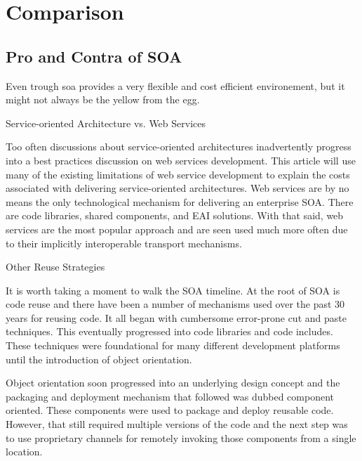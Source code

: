 \documentclass[12pt]{article}
\begin{document}
\section{Comparison}
\subsection{Pro and Contra of SOA}
Even trough \gls{soa} provides a very flexible and cost efficient environement, but it might not always be the yellow from the egg.



Service-oriented Architecture vs. Web Services

Too often discussions about service-oriented architectures inadvertently progress into a best practices discussion on web services development. This article will use many of the existing limitations of web service development to explain the costs associated with delivering service-oriented architectures. Web services are by no means the only technological mechanism for delivering an enterprise SOA. There are code libraries, shared components, and EAI solutions. With that said, web services are the most popular approach and are seen used much more often due to their implicitly interoperable transport mechanisms.

Other Reuse Strategies

It is worth taking a moment to walk the SOA timeline. At the root of SOA is code reuse and there have been a number of mechanisms used over the past 30 years for reusing code. It all began with cumbersome error-prone cut and paste techniques. This eventually progressed into code libraries and code includes. These techniques were foundational for many different development platforms until the introduction of object orientation.

Object orientation soon progressed into an underlying design concept and the packaging and deployment mechanism that followed was dubbed component oriented. These components were used to package and deploy reusable code. However, that still required multiple versions of the code and the next step was to use proprietary channels for remotely invoking those components from a single location.
\end{document}
